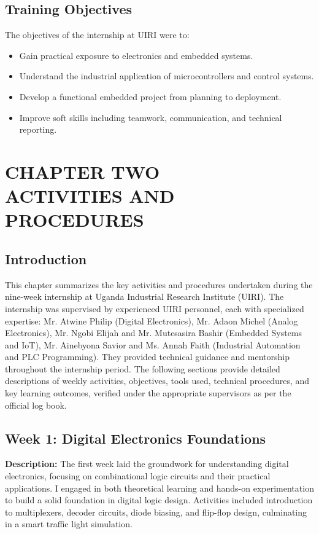 \documentclass[12pt,a4paper]{report}
\begin{document}
\section{Training Objectives}
\noindent The objectives of the internship at UIRI were to:
\begin{itemize}
    \item Gain practical exposure to electronics and embedded systems.
    \item Understand the industrial application of microcontrollers and control systems.
    \item Develop a functional embedded project from planning to deployment.
    \item Improve soft skills including teamwork, communication, and technical reporting.
\end{itemize}

\newpage
\chapter[CHAPTER TWO ACTIVITIES AND PROCEDURES]{CHAPTER TWO \\ACTIVITIES AND PROCEDURES}

\section{Introduction}

\noindent This chapter summarizes the key activities and procedures undertaken during the nine-week internship at Uganda Industrial Research Institute (UIRI). The internship was supervised by experienced UIRI personnel, each with specialized expertise: Mr. Atwine Philip (Digital Electronics), Mr. Adaon Michel (Analog Electronics), Mr. Ngobi Elijah and Mr. Mutesasira Bashir (Embedded Systems and IoT), Mr. Ainebyona Savior and Ms. Annah Faith (Industrial Automation and PLC Programming). They provided technical guidance and mentorship throughout the internship period. The following sections provide detailed descriptions of weekly activities, objectives, tools used, technical procedures, and key learning outcomes, verified under the appropriate supervisors as per the official log book.

\section{Week 1: Digital Electronics Foundations}

\noindent\textbf{Description:} The first week laid the groundwork for understanding digital electronics, focusing on combinational logic circuits and their practical applications. I engaged in both theoretical learning and hands-on experimentation to build a solid foundation in digital logic design. Activities included introduction to multiplexers, decoder circuits, diode biasing, and flip-flop design, culminating in a smart traffic light simulation.
\end{document}

